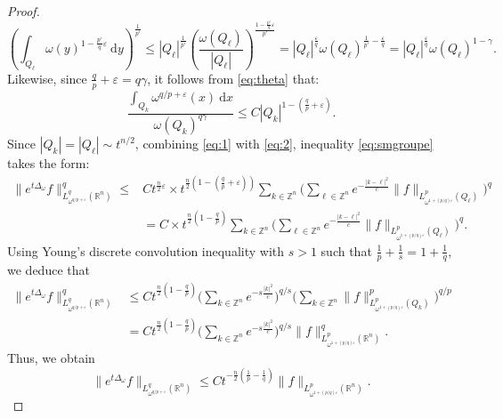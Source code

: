 \documentclass[10pt,a4paper]{amsart}
\begin{document}
\begin{proof}
\begin{equation}
        \left ( \int_{Q_{\ell}} \omega(y)^{1-\frac{p'}{q}\varepsilon}\ \mathrm{d} y \right )^{\frac{1}{p'}} \leq  |Q_\ell|^{\frac{1}{p'}} \left( \frac{\omega(Q_\ell)}{|Q_\ell|} \right)^{\frac{1-\frac{p'}{q}\varepsilon}{p'}}=  |Q_\ell|^{\frac{\varepsilon}{q}} \omega(Q_\ell)^{\frac{1}{p'}-\frac{\varepsilon}{q}}= |Q_\ell|^{\frac{\varepsilon}{q}} \omega(Q_\ell)^{1-\gamma}.
    \end{equation}
    Likewise, since $\frac{q}{p} + \varepsilon = q \gamma$, it follows from \eqref{eq:theta} that:
    \begin{equation}\label{eq:2}
        \frac{\int_{Q_{k}} \omega^{q/p+\varepsilon}(x) \ \mathrm{d}x}{\omega(Q_k)^{q\gamma}} \leq C |Q_k|^{1-(\frac{q}{p}+\varepsilon)}.
    \end{equation}
    Since $|Q_k| = |Q_\ell| \sim t^{n/2}$, combining \eqref{eq:1} with \eqref{eq:2}, inequality \eqref{eq:smgroupe} takes the form:
    \begin{align*}
        \| e^{t\Delta_\omega} f \|^q_{L^q_{{\omega}^{q/p+\varepsilon}}(\mathbb{R}^n)} \leq &C t^{\frac{n}{2} \varepsilon} \times t^{\frac{n}{2}(1-(\frac{q}{p}+\varepsilon))} \sum_{k\in \mathbb{Z}^n}  \bigg ( \sum_{\ell\in \mathbb{Z}^n} e^{-\frac{|k-\ell|^2}{c}}   \| f \|_{L^p_{\omega^{1+(p/q)\varepsilon}}(Q_{\ell})} \bigg )^q 
        \\& = C \times t^{\frac{n}{2}(1-\frac{q}{p})} \sum_{k\in \mathbb{Z}^n}  \bigg ( \sum_{\ell\in \mathbb{Z}^n} e^{-\frac{|k-\ell|^2}{c}}   \| f \|_{L^p_{\omega^{1+(p/q)\varepsilon}}(Q_{\ell})} \bigg )^q. 
    \end{align*}
    Using Young's discrete convolution inequality with $s>1$ such that $\frac{1}{p}+\frac{1}{s}=1+\frac{1}{q}$, we deduce that 
    \begin{align*}
        \| e^{t\Delta_\omega} f \|^q_{L^q_{{\omega}^{q/p+\varepsilon}}(\mathbb{R}^n)} &\leq C t^{\frac{n}{2}(1-\frac{q}{p})} \bigg ( \sum_{k\in \mathbb{Z}^n} e^{-s\frac{|k|^2}{c}} \bigg )^{q/s} \bigg ( \sum_{k\in \mathbb{Z}^n}  \|f \|^p_{L^p_{\omega^{1+(p/q)\varepsilon}}(Q_{k})} \bigg )^{q/p} \\&= C t^{\frac{n}{2}(1-\frac{q}{p})} \bigg( \sum_{k\in \mathbb{Z}^n} e^{-s\frac{|k|^2}{c}} \bigg )^{q/s} \|f \|^q_{L^p_{\omega^{1+(p/q)\varepsilon}}(\mathbb{R}^n)}.
    \end{align*}
     Thus, we obtain
    $$\| e^{t\Delta_\omega} f \|_{L^q_{{\omega}^{q/p+\varepsilon}}(\mathbb{R}^n)} \leq C t^{-\frac{n}{2}(\frac{1}{p}-\frac{1}{q})} \|  f \|_{L^p_{\omega^{1+(p/q)\varepsilon}}(\mathbb{R}^n)}.$$
\end{proof}
\end{document}
